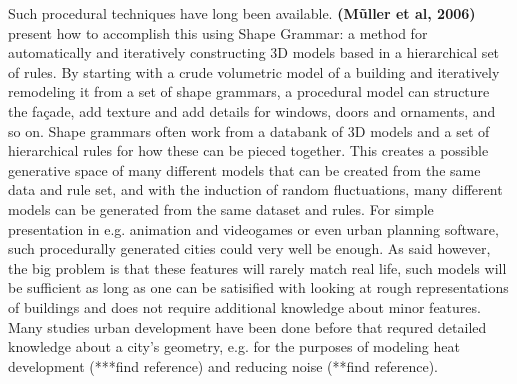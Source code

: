 \documentclass{kththesis}
\begin{document}
Such procedural techniques have long been available.
\textbf{(Mũller et al, 2006)} present how to accomplish this using Shape Grammar: a method for automatically and iteratively constructing 3D models based in a hierarchical set of rules.
By starting with a crude volumetric model of a building and iteratively remodeling it from a set of shape grammars, a procedural model can structure the façade, add texture and add details for windows, doors and ornaments, and so on.
Shape grammars often work from a databank of 3D models and a set of hierarchical rules for how these can be pieced together.
This creates a possible generative space of many different models that can be created from the same data and rule set, and with the induction of random fluctuations, many different models can be generated from the same dataset and rules.
For simple presentation in e.g. animation and videogames or even urban planning software, such procedurally generated cities could very well be enough.
As said however, the big problem is that these features will rarely match real life, such models will be sufficient as long as one can be satisified with looking at rough representations of buildings and does not require additional knowledge about minor features.
Many studies urban development have been done before that requred detailed knowledge about a city's geometry, e.g. for the purposes of modeling heat development (***find reference) and reducing noise (**find reference).
\end{document}
